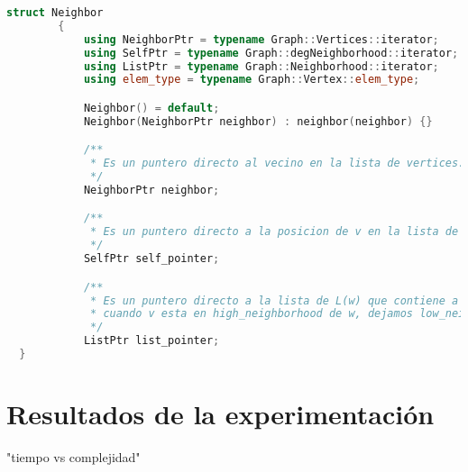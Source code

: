 \documentclass[a4paper,12pt]{article}
\begin{document}
\begin{lstlisting}[language={C++},caption={Neighbor.h},gobble=2,float=ht,label={lst:c++:graph}]
     struct Neighbor
        {
            using NeighborPtr = typename Graph::Vertices::iterator;
            using SelfPtr = typename Graph::degNeighborhood::iterator;
            using ListPtr = typename Graph::Neighborhood::iterator;
            using elem_type = typename Graph::Vertex::elem_type;

            Neighbor() = default;
            Neighbor(NeighborPtr neighbor) : neighbor(neighbor) {}

            /**
             * Es un puntero directo al vecino en la lista de vertices.
             */
            NeighborPtr neighbor;

            /**
             * Es un puntero directo a la posicion de v en la lista de N(w) que lo contiene.
             */
            SelfPtr self_pointer;

            /**
             * Es un puntero directo a la lista de L(w) que contiene a v. (Solo tiene en cuenta los low_neighborhood;
             * cuando v esta en high_neighborhood de w, dejamos low_neighborhood.end())
             */
            ListPtr list_pointer;
  }
\end{lstlisting}

\section{Resultados de la experimentación}
\label{sec:experimentación}
"tiempo vs complejidad"
\end{document}
